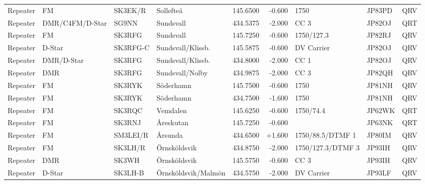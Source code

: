 \begin{landscape}
\begin{longtable}{llllrrlll}
	Repeater          & FM              & SK3EK/R  & Sollefteå           &     145.6500 &     -0.600 & 1750               & JP83PD      & QRV      \\
	Repeater          & DMR/C4FM/D-Star & SG9NN    & Sundsvall           &     434.5375 &     -2.000 & CC 3               & JP82OJ      & QRT      \\
	Repeater          & FM              & SK3RFG   & Sundsvall           &     145.7250 &     -0.600 & 1750/127.3         & JP82RJ      & QRV      \\
	Repeater          & D-Star          & SK3RFG-C & Sundsvall/Klissb.   &     145.5875 &     -0.600 & DV Carrier         & JP82OJ      & QRV      \\
	Repeater          & DMR/D-Star      & SK3RFG   & Sundsvall/Klissb.   &     434.8000 &     -2.000 & CC 1               & JP82OJ      & QRV      \\
	Repeater          & DMR             & SK3RFG   & Sundsvall/Nolby     &     434.9875 &     -2.000 & CC 3               & JP82QH      & QRV      \\
	Repeater          & FM              & SK3RYK   & Söderhamn           &     145.7500 &     -0.600 & 1750               & JP81NH      & QRV      \\
	Repeater          & FM              & SK3RYK   & Söderhamn           &     434.7500 &     -1.600 & 1750               & JP81NH      & QRV      \\
	Repeater          & FM              & SK3RQC   & Vemdalen            &     145.6250 &     -0.600 & 1750/74.4          & JP62WK      & QRT      \\
	Repeater          & FM              & SK3RNJ   & Åreskutan           &     145.7250 &     -0.600 &                    & JP63NK      & QRT      \\
	Repeater          & FM              & SM3LEI/R & Årsunda             &     434.6500 &     +1.600 & 1750/88.5/DTMF 1   & JP80IM      & QRV      \\
	Repeater          & FM              & SK3LH/R  & Örnsköldsvik        &     434.8750 &     -2.000 & 1750/127.3/DTMF 3  & JP93IH      & QRV      \\
	Repeater          & DMR             & SK3WH    & Örnsköldsvik        &     145.5750 &     -0.600 & CC 3               & JP93IH      & QRV      \\
	Repeater          & D-Star          & SK3LH-B  & Örnsköldsvik/Malmön &     434.5750 &     -2.000 & DV Carrier         & JP93LF      & QRV      \\

\end{longtable}
\end{landscape}
